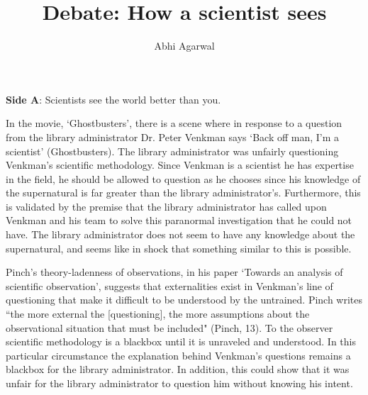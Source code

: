 \documentclass[11pt, oneside]{article}
\title{Debate: How a scientist sees\vspace{-0.4cm}}
\author{Abhi Agarwal\vspace{-1cm}}
\date{}
\begin{document}
\maketitle



\noindent \textbf{Side A}: Scientists see the world better than you.

\par In the movie, `Ghostbusters', there is a scene where in response to a question from the library administrator Dr. Peter Venkman says `Back off man, I'm a scientist' (Ghostbusters). The library administrator was unfairly questioning Venkman's scientific methodology. Since Venkman is a scientist he has expertise in the field, he should be allowed to question as he chooses since his knowledge of the supernatural is far greater than the library administrator's. Furthermore, this is validated by the premise that the library administrator has called upon Venkman and his team to solve this paranormal investigation that he could not have. The library administrator does not seem to have any knowledge about the supernatural, and seems like in shock that something similar to this is possible.


\par Pinch's theory-ladenness of observations, in his paper `Towards an analysis of scientific observation', suggests that externalities exist in Venkman's line of questioning that make it difficult to be understood by the untrained. Pinch writes ``the more external the [questioning], the more assumptions about the observational situation that must be included" (Pinch, 13). To the observer scientific methodology is a blackbox until it is unraveled and understood. In this particular circumstance the explanation behind Venkman's questions remains a blackbox for the library administrator. In addition, this could show that it was unfair for the library administrator to question him without knowing his intent.
\end{document}
